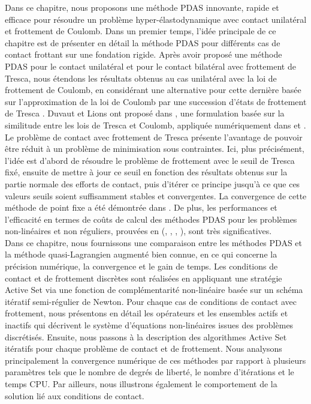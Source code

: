 Dans ce chapitre, nous proposons une méthode PDAS innovante, rapide et efficace pour résoudre un problème hyper-élastodynamique avec contact unilatéral et frottement de Coulomb. Dans un premier temps, l'idée principale de ce chapitre est de présenter en détail la méthode PDAS pour différents cas de contact frottant sur une fondation rigide. Après avoir proposé une méthode PDAS pour le contact unilatéral et pour le contact bilatéral avec frottement de Tresca, nous étendons les résultats obtenus au cas unilatéral avec la loi de frottement de Coulomb, en considérant une alternative pour cette dernière basée sur l'approximation de la loi de Coulomb par une succession d'états de frottement de Tresca \cite{hueber2008primal}. Duvaut et Lions ont proposé dans \cite{duvaut1972inequations}, une formulation basée sur la similitude entre les lois de Tresca et Coulomb, appliquée numériquement dans \cite{raous1988numerical} et \cite{hueber2008primal}. Le problème de contact avec frottement de Tresca présente l’avantage de pouvoir être réduit à un problème de minimisation sous contraintes. Ici, plus précisément, l'idée est d'abord de résoudre le problème de frottement avec le seuil de Tresca fixé, ensuite de mettre à jour ce seuil en fonction des résultats obtenus sur la partie normale des efforts de contact, puis d'itérer ce principe jusqu'à ce que ces valeurs seuils soient suffisamment stables et convergentes. La convergence de cette méthode de point fixe a été démontrée dans \cite{licht1991remarks}. De plus, les performances et l'efficacité en termes de coûts de calcul des méthodes PDAS pour les problèmes non-linéaires et non réguliers, prouvées en (\cite{abide2016analysis}, \cite{barboteu2015hyperelastic}, \cite{hueber2008primal}, \cite{hueber2005primal}), sont très significatives.\\

Dans ce chapitre, nous fournissons une comparaison entre les méthodes PDAS et la méthode quasi-Lagrangien augmenté bien connue, en ce qui concerne la précision numérique, la convergence et le gain de temps. Les conditions de contact et de frottement discrètes sont réalisées en appliquant une stratégie Active Set via une fonction de complémentarité non-linéaire basée sur un schéma itératif semi-régulier de Newton. Pour chaque cas de conditions de contact avec frottement, nous présentons en détail les opérateurs et les ensembles actifs et inactifs qui décrivent le système d'équations non-linéaires issues des problèmes discrétisés. Ensuite, nous passons à la description des algorithmes Active Set itératifs pour chaque problème de contact et de frottement. Nous analysons principalement la convergence numérique de ces méthodes par rapport à plusieurs paramètres tels que le nombre de degrés de liberté, le nombre d'itérations et le temps CPU. Par ailleurs, nous illustrons également le comportement de la solution lié aux conditions de contact.\\


